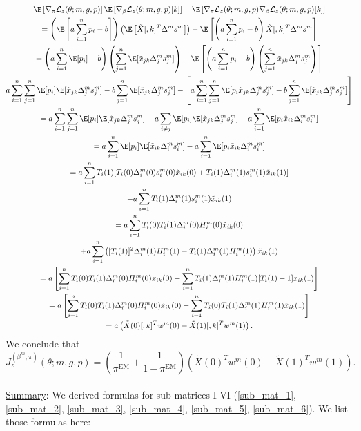 \documentclass[12pt]{article}
\begin{document}
\begin{multline*}
\E \left[ \nabla_\pi \mathcal{L}_z(\theta; m, g, p) \right] \E\left[ \nabla_{\beta} \mathcal{L}_z(\theta; m, g, p)[k] \right] - \E \left[\nabla_{\pi}\mathcal{L}_z(\theta; m,g,p) \nabla_{\beta}\mathcal{L}_z(\theta; m,g,p)[k] \right] \\= \left(\E \left[ a \sum_{i=1}^n p_i - b \right] \right) \left(\E\left[ \tilde{X}[,k]^T \Delta^m s^m \right] \right) - \E \left[ \left( a \sum_{i=1}^n p_i - b \right) \tilde{X}[,k]^T \Delta^m s^m \right] \\ = \left( a \sum_{i=1}^n \E[p_i] - b \right) \left( \sum_{j=1}^n \E [ \tilde{x}_{jk}\Delta^m_js^m_j] \right) - \E \left[ \left( a \sum_{i=1}^n p_i - b \right) \left( \sum_{j=1}^n \tilde{x}_{jk} \Delta^m_j s^m_j \right) \right] \\ a \sum_{i=1}^n \sum_{j=1}^n \E [p_i] \E[ \tilde{x}_{jk} \Delta^m_j s^m_j] - b \sum_{j=1}^n \E[\tilde{x}_{jk} \Delta^m_j s^m_j] - \left[ a \sum_{i=1}^n \sum_{j=1}^n \E [ p_i \tilde{x}_{jk} \Delta^m_j s^m_j] - b \sum_{j=1}^n \E[\tilde{x}_{jk} \Delta^m_j s^m_j] \right] \\ =  a \sum_{i=1}^n \sum_{j=1}^n \E[p_i] \E[\tilde{x}_{jk} \Delta^m_j s^m_j] - a\sum_{i \neq j} \E[p_i] \E[\tilde{x}_{jk} \Delta^m_j s^m_j] - a\sum_{i=1}^n \E[ p_i \tilde{x}_{ik} \Delta^m_i s^m_i ] \\ = a \sum_{i=1}^n \E[p_i] \E[ \tilde{x}_{ik} \Delta^m_i s^m_i] - a \sum_{i=1}^n \E[p_i \tilde{x}_{ik} \Delta^m_i s^m_i] \\ = a \sum_{i=1}^n T_i(1) [T_i(0) \Delta^m_i(0) s^m_i(0) \tilde{x}_{ik}(0) + T_i(1) \Delta^m_i(1) s^m_i(1) \tilde{x}_{ik}(1)] \\ - a \sum_{i=1}^n T_i(1)\Delta^m_i(1)s^m_i(1)\tilde{x}_{ik}(1) \\ = a \sum_{i=1}^n T_i(0)T_i(1) \Delta_i^m(0)H^m_i(0)\tilde{x}_{ik}(0) \\ + a \sum_{i=1}^n \left( [T_i(1)]^2 \Delta^m_i(1)H^m_i(1) - T_i(1)\Delta^m_i(1)H^m_i(1) \right) \tilde{x}_{ik}(1)  \\ =a \left[ \sum_{i=1}^n T_i(0) T_i(1) \Delta^m_i(0) H^m_i(0) \tilde{x}_{ik}(0) + \sum_{i=1}^n T_i(1)\Delta^m_i(1)H^m_i(1)[T_i(1) - 1] \tilde{x}_{ik}(1) \right] \\ = a \left[ \sum_{i=1}^n T_i(0) T_i(1) \Delta^m_i(0) H^m_i(0) \tilde{x}_{ik}(0) - \sum_{i=1}^n T_i(0) T_i(1) \Delta^m_i(1) H^m_i(1) \tilde{x}_{ik}(1) \right] \\ = a\left(\tilde{X}(0)[,k]^T w^m(0) - \tilde{X}(1)[,k]^T w^m(1)  \right).
\end{multline*}
We conclude that
\begin{equation}\label{sub_mat_6_formula} J^{(\beta^m, \pi)}_z(\theta; m, g, p) = \left( \frac{1}{\pi^\textrm{EM}} + \frac{1}{1 - \pi^\textrm{EM}} \right) \left( \tilde{X}(0)^T w^m(0) - \tilde{X}(1)^T w^m(1)\right). \end{equation}
 \\ \noindent
\underline{Summary}: We derived formulas for sub-matrices I-VI (\ref{sub_mat_1}, \ref{sub_mat_2}, \ref{sub_mat_3}, \ref{sub_mat_4}, \ref{sub_mat_5}, \ref{sub_mat_6}). We list those formulas here:
\end{document}
